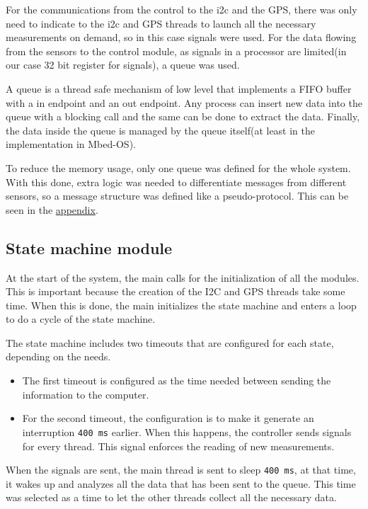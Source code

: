 For the communications from the control to the \acrshort{i2c} and the GPS, there was only need to indicate to the \acrshort{i2c} and GPS threads to launch all the necessary measurements on demand, so in this case signals were used.
For the data flowing from the sensors to the control module, as signals in a processor are limited(in our case 32 bit register for signals), a queue was used.

A queue is a thread safe mechanism of low level that implements a FIFO buffer with a in endpoint and an out endpoint. Any process can insert new data into the queue with a blocking call and the same can be done to extract the data. Finally, the data 
inside the queue is managed by the queue itself(at least in the implementation in Mbed-OS).

To reduce the memory usage, only one queue was defined for the whole system. With this done, extra logic was needed to differentiate messages from different sensors, so a message structure was defined like a pseudo-protocol. This can be seen in the \hyperref[appendix]{appendix}.

\subsection{State machine module}
At the start of the system, the main calls for the initialization of all the modules. This is important because the creation of the I2C and GPS threads take some time. When this is done, the main initializes the state machine 
and enters a loop to do a cycle of the state machine.

The state machine includes two timeouts that are configured for each state, depending on the needs.
\begin{itemize}
    \item The first timeout is configured as the time needed between sending the information to the computer.
    \item For the second timeout, the configuration is to make it generate an interruption \texttt{400 ms} earlier. When this happens, the controller sends signals for every thread. This signal enforces the reading of new 
    measurements.
\end{itemize}
When the signals are sent, the main thread is sent to sleep \texttt{400 ms}, at that time, it wakes up and analyzes all the data that has been sent to the queue. This time was selected as a time to let the other threads collect all the necessary data.

